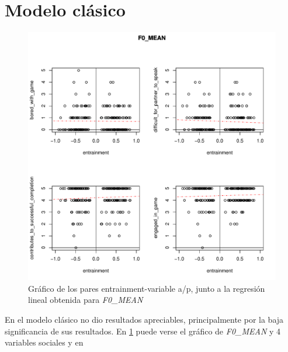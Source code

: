 \section{Modelo clásico}

\begin{figure}
\includegraphics[width=15cm]{images/regression_F0_MEAN_1.pdf}
\caption{Gráfico de los pares entrainment-variable a/p, junto a la regresión lineal obtenida \label{regresion_clasica} para \emph{F0\_MEAN}}
\end{figure}





En el modelo clásico no dio resultados apreciables, principalmente por la baja significancia de sus resultados. En \ref{regresion_clasica} puede verse el gráfico de \emph{F0\_MEAN} y 4 variables sociales y en

\begin{figure}

\end{figure}
